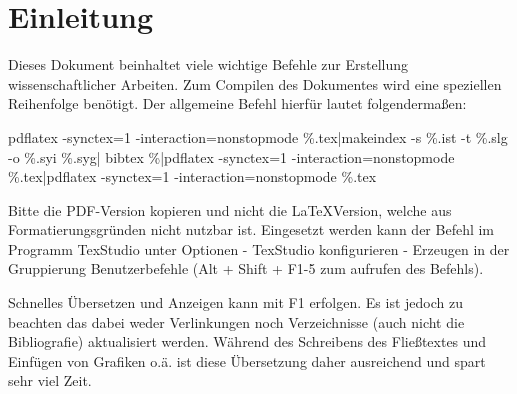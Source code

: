 \chapter{Einleitung}
Dieses Dokument beinhaltet viele wichtige Befehle zur Erstellung wissenschaftlicher Arbeiten. Zum Compilen des Dokumentes wird eine speziellen Reihenfolge benötigt. Der allgemeine Befehl hierfür lautet folgendermaßen:

pdflatex -synctex=1 -interaction=nonstopmode \%.tex|makeindex -s \%.ist -t \%.slg -o \%.syi \%.syg| bibtex \%|pdflatex -synctex=1 -interaction=nonstopmode \%.tex|pdflatex -synctex=1 -interaction=nonstopmode \%.tex

Bitte die PDF-Version kopieren und nicht die \LaTeX Version, welche aus Formatierungsgründen nicht nutzbar ist. Eingesetzt werden kann der Befehl im Programm TexStudio unter Optionen - TexStudio konfigurieren - Erzeugen in der Gruppierung Benutzerbefehle (Alt + Shift + F1-5 zum aufrufen des Befehls).

Schnelles Übersetzen und Anzeigen kann mit F1 erfolgen. Es ist jedoch zu beachten das dabei weder Verlinkungen noch Verzeichnisse (auch nicht die Bibliografie) aktualisiert werden. Während des Schreibens des Fließtextes und Einfügen von Grafiken o.ä. ist diese Übersetzung daher ausreichend und spart sehr viel Zeit.